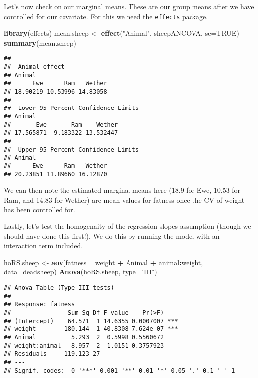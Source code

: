 \documentclass[]{book}
\newenvironment{Shaded}{\begin{snugshade}}{\end{snugshade}}
\newcommand{\KeywordTok}[1]{\textcolor[rgb]{0.13,0.29,0.53}{\textbf{#1}}}
\newcommand{\DataTypeTok}[1]{\textcolor[rgb]{0.13,0.29,0.53}{#1}}
\newcommand{\StringTok}[1]{\textcolor[rgb]{0.31,0.60,0.02}{#1}}
\newcommand{\OtherTok}[1]{\textcolor[rgb]{0.56,0.35,0.01}{#1}}
\newcommand{\OperatorTok}[1]{\textcolor[rgb]{0.81,0.36,0.00}{\textbf{#1}}}
\newcommand{\NormalTok}[1]{#1}
\theoremstyle{definition}
\theoremstyle{definition}
\theoremstyle{definition}
\theoremstyle{remark}
\begin{document}
Let's now check on our marginal means. These are our group means after
we have controlled for our covariate. For this we need the
\texttt{effects} package.

\begin{Shaded}
\begin{Highlighting}[]
\KeywordTok{library}\NormalTok{(effects)}
\NormalTok{mean.sheep <-}\StringTok{ }\KeywordTok{effect}\NormalTok{(}\StringTok{"Animal"}\NormalTok{, sheepANCOVA, }\DataTypeTok{se=}\OtherTok{TRUE}\NormalTok{)}
\KeywordTok{summary}\NormalTok{(mean.sheep)}
\end{Highlighting}
\end{Shaded}

\begin{verbatim}
## 
##  Animal effect
## Animal
##      Ewe      Ram   Wether 
## 18.90219 10.53996 14.83058 
## 
##  Lower 95 Percent Confidence Limits
## Animal
##       Ewe       Ram    Wether 
## 17.565871  9.183322 13.532447 
## 
##  Upper 95 Percent Confidence Limits
## Animal
##      Ewe      Ram   Wether 
## 20.23851 11.89660 16.12870
\end{verbatim}

We can then note the estimated marginal means here (18.9 for Ewe, 10.53
for Ram, and 14.83 for Wether) are mean values for fatness once the CV
of weight has been controlled for.

Lastly, let's test the homogenaity of the regression slopes assumption
(though we should have done this first!). We do this by running the
model with an interaction term included.

\begin{Shaded}
\begin{Highlighting}[]
\NormalTok{hoRS.sheep <-}\StringTok{ }\KeywordTok{aov}\NormalTok{(fatness }\OperatorTok{~}\StringTok{ }\NormalTok{weight }\OperatorTok{+}\StringTok{ }\NormalTok{Animal }\OperatorTok{+}\StringTok{ }\NormalTok{animal}\OperatorTok{:}\NormalTok{weight, }\DataTypeTok{data=}\NormalTok{deadsheep)}
\KeywordTok{Anova}\NormalTok{(hoRS.sheep, }\DataTypeTok{type=}\StringTok{"III"}\NormalTok{)}
\end{Highlighting}
\end{Shaded}

\begin{verbatim}
## Anova Table (Type III tests)
## 
## Response: fatness
##                Sum Sq Df F value    Pr(>F)    
## (Intercept)    64.571  1 14.6355 0.0007007 ***
## weight        180.144  1 40.8308 7.624e-07 ***
## Animal          5.293  2  0.5998 0.5560672    
## weight:animal   8.957  2  1.0151 0.3757923    
## Residuals     119.123 27                      
## ---
## Signif. codes:  0 '***' 0.001 '**' 0.01 '*' 0.05 '.' 0.1 ' ' 1
\end{verbatim}
\end{document}
